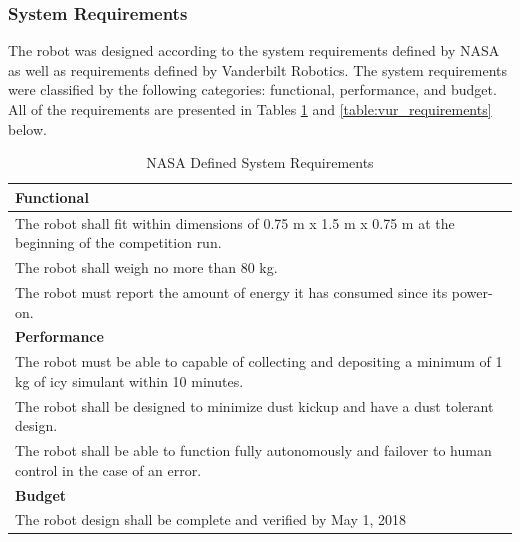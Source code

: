 \documentclass[class=article, crop=false]{standalone}
\begin{document}
	\subsubsection{System Requirements}
	The robot was designed according to the system requirements defined by NASA as well as requirements defined by Vanderbilt Robotics. The system requirements were classified by the following categories: functional, performance, and budget. All of the requirements are presented in Tables \ref{table:nasa_requirements} and  \ref{table:vur_requirements} below.
	\FloatBarrier
	\begin{table}[h]
	\footnotesize
	\centering
	\begin{tabular}{ | m{38em} | } 
 	\hline
 		\textbf{Functional} \\ 
 		\hline
 		The robot shall fit within dimensions of 0.75 m x 1.5 m x 0.75 m at the beginning of the competition run. \\ 
 		\hline
 		The robot shall weigh no more than 80 kg. \\ 
 		\hline
 		The robot must report the amount of energy it has consumed since its power-on. \\
 		\hline
 		\textbf{Performance} \\ 
 		\hline
 		The robot must be able to capable of collecting and depositing a minimum of 1 kg of icy simulant within 10 minutes. \\
 		\hline
 		The robot shall be designed to minimize dust kickup and have a dust tolerant design.  \\
 		\hline
 		The robot shall be able to function fully autonomously and failover to human control in the case of an error. \\
 		\hline
 		\textbf{Budget} \\
 		\hline
		The robot design shall be complete and verified by May 1, 2018 \\
 	\hline
	\end{tabular}
	\caption{NASA Defined System Requirements}
		\label{table:nasa_requirements}
	\end{table}
	\FloatBarrier
	
\end{document}
